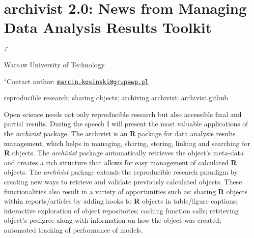 \documentclass[\main/boa.tex]{subfiles}
\begin{document}
\section{archivist 2.0: News from Managing Data Analysis Results Toolkit}

\begin{center}
  {\bf {}$^{1^\star}$}
\end{center}

\vskip 0.3cm

\begin{affiliations}
\begin{enumerate}
\begin{minipage}{0.915\textwidth}
\centering
\item Warsaw University of Technology \\[-2pt]
\end{minipage}
\end{enumerate}
$^\star$Contact author: \href{mailto:marcin.kosinski@grupawp.pl}{\nolinkurl{marcin.kosinski@grupawp.pl}}\\
\end{affiliations}

\vskip 0.5cm

\begin{minipage}{0.915\textwidth}
\keywords reproducible research; sharing objects; archiving
\packages archivist; archivist.github
\end{minipage}

\vskip 0.8cm

Open science needs not only reproducible research but also accessible
final and partial results. During the speech I will present the most
valuable applications of the \emph{archivist} package. The archivist is
an \textbf{R} package for data analysis results management, which helps
in managing, sharing, storing, linking and searching for \textbf{R}
objects. The \emph{archivist} package automatically retrieves the
object's meta-data and creates a rich structure that allows for easy
management of calculated \textbf{R} objects. The \emph{archivist}
package extends the reproducible research paradigm by creating new ways
to retrieve and validate previously calculated objects. These
functionalities also result in a variety of opportunities such as:
sharing \textbf{R} objects within reports/articles by adding hooks to
\textbf{R} objects in table/figure captions; interactive exploration of
object repositories; caching function calls; retrieving object's
pedigree along with information on how the object was created; automated
tracking of performance of models.
\end{document}

